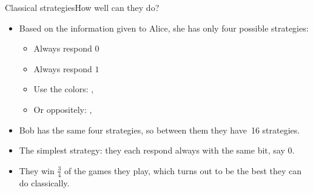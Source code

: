 {\begin{frame}{Classical strategies}{How well can they do?}

\begin{itemize}[<+->]
    \item Based on the information given to Alice, she has only four possible strategies:
    \begin{itemize}
        \item Always respond $0$
        \item Always respond $1$
        \item Use the colors:  , 
        \item Or oppositely:  , 
    \end{itemize}
    \item Bob has the same four strategies, so between them they have~16 strategies.
    \item The simplest strategy: they each respond always with the same bit, say $0$.
    \item They win $\frac{3}{4}$ of the games they play, which turns out to be the best they can do classically.
\end{itemize}
    
\end{frame}

}
